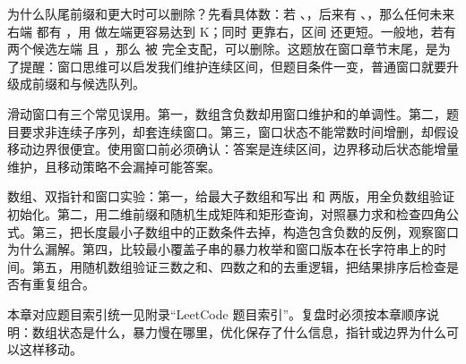 为什么队尾前缀和更大时可以删除？先看具体数：若 、，后来有 、，那么任何未来右端  都有 ，用  做左端更容易达到 K；同时  更靠右，区间 \code{[j,r)} 还更短。一般地，若有两个候选左端  且 ，那么  被  完全支配，可以删除。这题放在窗口章节末尾，是为了提醒：窗口思维可以启发我们维护连续区间，但题目条件一变，普通窗口就要升级成前缀和与候选队列。

\begin{warningbox}
滑动窗口有三个常见误用。第一，数组含负数却用窗口维护和的单调性。第二，题目要求非连续子序列，却套连续窗口。第三，窗口状态不能常数时间增删，却假设移动边界很便宜。使用窗口前必须确认：答案是连续区间，边界移动后状态能增量维护，且移动策略不会漏掉可能答案。
\end{warningbox}

\begin{labbox}
数组、双指针和窗口实验：第一，给最大子数组和写出  和  两版，用全负数组验证初始化。第二，用二维前缀和随机生成矩阵和矩形查询，对照暴力求和检查四角公式。第三，把长度最小子数组中的正数条件去掉，构造包含负数的反例，观察窗口为什么漏解。第四，比较最小覆盖子串的暴力枚举和窗口版本在长字符串上的时间。第五，用随机数组验证三数之和、四数之和的去重逻辑，把结果排序后检查是否有重复组合。
\end{labbox}

本章对应题目索引统一见附录“LeetCode 题目索引”。复盘时必须按本章顺序说明：数组状态是什么，暴力慢在哪里，优化保存了什么信息，指针或边界为什么可以这样移动。




